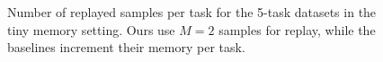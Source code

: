 
\begin{figure}[t]
  \centering
  \setlength{\figwidth}{0.3\textwidth}
  \setlength{\figheight}{.12\textheight}
  \vspace{-2mm}
  
  \vspace{-4mm}
  \caption{
  Number of replayed samples per task for the 5-task datasets in the tiny memory setting. Ours use $M=2$ samples for replay, while the baselines increment their memory per task. %
  }
  \vspace{-4mm}
  \label{fig:tiny_memory_experiment_memory_usage}
\end{figure}